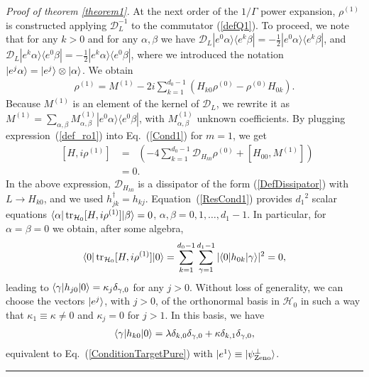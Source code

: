 \documentclass[aps,pra,letterpaper,twocolumn,showpacs,superscriptaddress,floatfix,longbibliography]{revtex4-1}
\newcommand{\traccazero}{\mathop{\mathrm{tr}_{\mathcal{H}_0}}\limits}
\newcommand{\eket}[2]{|e^#1 #2 \rangle}
\newcommand{\ebra}[2]{\langle e^#1 #2|}
\newenvironment{proof}[1][Proof]{\noindent\textit{#1.} }{\
  \rule{0.5em}{0.5em}}
\begin{document}
\begin{proof}[Proof of theorem \ref{theorem1}]
  At the next order of the $1/\Gamma$ power expansion, $\rho^{(1)}$ is
  constructed applying $\mathcal{D}_L^{-1}$ to the commutator
  (\ref{defQ1}). To proceed, we note that for any $k>0$ and for any
  $\alpha,\beta$ we have $\mathcal{D}_L \eket{0}{\alpha}
  \ebra{k}{\beta} =-\frac{1}{2} \eket{0}{\alpha} \ebra{k}{\beta}$, and
  $\mathcal{D}_L \eket{k}{\alpha} \ebra{0}{\beta} =-\frac{1}{2}
  \eket{k}{\alpha} \ebra{0}{\beta}$, where we introduced the notation
  $\eket{j}{\alpha}=\ket{e^j}\otimes\ket{\alpha}$.  We obtain
  \begin{align}
    \rho^{(1)}= M^{(1)} -2 i \sum_{k=1}^{d_0-1}
    \left(H_{k0}\rho^{(0)}-\rho^{(0)}H_{0k} \right).
    \label{def_ro1}
  \end{align}
  Because $M^{(1)}$ is an element of the kernel of $\mathcal{D}_L$, we
  rewrite it as $M^{(1)}= \sum_{\alpha,\beta} M^{(1)}_{\alpha,\beta}
  \eket{0}{\alpha} \ebra{0}{\beta}$, with $M^{(1)}_{\alpha,\beta}$
  unknown coefficients. By plugging expression~(\ref{def_ro1}) into
  Eq.~(\ref{Cond1}) for $m=1$, we get
  \begin{align}
    \traccazero[H,i \rho^{(1)}] &= \traccazero\left( -4
      \sum_{k=1}^{d_0-1} \mathcal{D}_{H_{k0}} \rho^{(0)} +
      [H_{00},M^{(1)}] \right) \nonumber \\ &= 0.
    \label{ResCond1}
  \end{align}
  In the above expression,
  $\mathcal{D}_{H_{k0}}$ is a dissipator of the form
  (\ref{DefDissipator}) with $L\to H_{k0}$, and we used $
  h_{jk}^\dagger=h_{kj}$.  Equation~(\ref{ResCond1}) provides
  ${d_1}^2$ scalar equations $\bra{\alpha} \traccazero[H,i \rho^{(1)}
  ] \ket{\beta}=0$, $\alpha,\beta=0,1,\dots,d_1-1$. In particular, for
  $\alpha=\beta=0$ we obtain, after some algebra,
  \begin{align}
    \bra{0} \traccazero[H,i \rho^{(1)}] \ket{0} =
    \sum_{k=1}^{d_0-1}\sum_{\gamma=1}^{d_1-1}
    |\bra{0}h_{0k}\ket{\gamma}|^2=0,
    \label{ResCond1_00}
  \end{align}
  leading to $\langle{\gamma}|h_{j0}|{0}\rangle =\kappa_j \delta_{\gamma,0}$
  for any $j>0$.  Without loss of generality, we can choose the
  vectors $|{e^j}\rangle$, with $j>0$, of the orthonormal basis in
  $\mathcal{H}_0$ in such a way that $\kappa_1 \equiv \kappa \neq 0$
  and $\kappa_j =0$ for $j>1$. In this basis, we have
  \begin{align}
    \langle{\gamma}|h_{k0}|{0}\rangle = \lambda \delta_{k,0}
    \delta_{\gamma,0}+ \kappa\delta_{k,1} \delta_{\gamma,0},
    \label{ConditionAllCzero}
  \end{align}
  equivalent to Eq.~(\ref{ConditionTargetPure}) with $|{e^1}\rangle \equiv
  |{\psi_{\rm{Zeno}}^\perp}\rangle$.
\end{proof}
\end{document}
